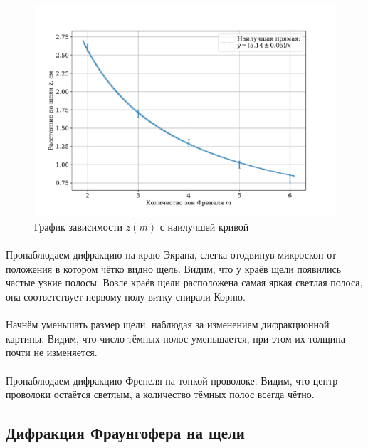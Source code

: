 \documentclass[a4paper,12pt]{article} %
\begin{document}
\begin{figure}
\centering
\includegraphics[width=\textwidth]{exp1.pdf}
\caption{График зависимости $z(m)$ с наилучшей кривой}
\label{fig:exp1}
\end{figure}

\paragraph{} Пронаблюдаем дифракцию на краю Экрана, слегка отодвинув микроскоп от положения в котором чётко видно щель. Видим, что у краёв щели появились частые узкие полосы. Возле краёв щели расположена самая яркая светлая полоса, она соответствует первому полу-витку спирали Корню.

\paragraph{} Начнём уменьшать размер щели, наблюдая за изменением дифракционной картины. Видим, что число тёмных полос уменьшается, при этом их толщина почти не изменяется.

\paragraph{} Пронаблюдаем дифракцию Френеля на тонкой проволоке. Видим, что центр проволоки остаётся светлым, а количество тёмных полос всегда чётно.

\subsection{Дифракция Фраунгофера на щели}
\end{document}
